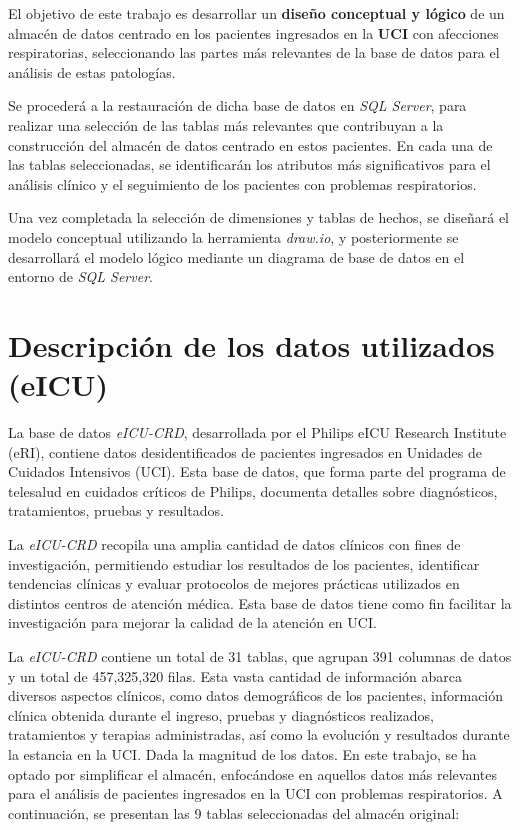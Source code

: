 \documentclass[12pt, a4paper, twoside]{article}
\begin{document}
	El objetivo de este trabajo es desarrollar un \textbf{diseño conceptual y lógico} de un almacén de datos centrado en los pacientes ingresados en la \textbf{UCI} con afecciones respiratorias, seleccionando las partes más relevantes de la base de datos para el análisis de estas patologías.
	
	Se procederá a la restauración de dicha base de datos en \textit{SQL Server}, para realizar una selección de las tablas más relevantes que contribuyan a la construcción del almacén de datos centrado en estos pacientes. En cada una de las tablas seleccionadas, se identificarán los atributos más significativos para el análisis clínico y el seguimiento de los pacientes con problemas respiratorios. 
	
	Una vez completada la selección de dimensiones y tablas de hechos, se diseñará el modelo conceptual utilizando la herramienta \textit{draw.io}, y posteriormente se desarrollará el modelo lógico mediante un diagrama de base de datos en el entorno de \textit{SQL Server}. 
	
	\section{Descripción de los datos utilizados (eICU)}
	
	 La base de datos \textit{eICU-CRD}, desarrollada por el Philips eICU Research Institute (eRI), contiene datos desidentificados de pacientes ingresados en Unidades de Cuidados Intensivos (UCI). Esta base de datos, que forma parte del programa de telesalud en cuidados críticos de Philips, documenta detalles sobre diagnósticos, tratamientos, pruebas y resultados.
	
	La \textit{eICU-CRD} recopila una amplia cantidad de datos clínicos con fines de investigación, permitiendo estudiar los resultados de los pacientes, identificar tendencias clínicas y evaluar protocolos de mejores prácticas utilizados en distintos centros de atención médica. Esta base de datos tiene como fin facilitar la investigación para mejorar la calidad de la atención en UCI.
	
	La \textit{eICU-CRD} contiene un total de 31 tablas, que agrupan 391 columnas de datos y un total de 457,325,320 filas. Esta vasta cantidad de información abarca diversos aspectos clínicos, como datos demográficos de los pacientes, información clínica obtenida durante el ingreso, pruebas y diagnósticos realizados, tratamientos y terapias administradas, así como la evolución y resultados durante la estancia en la UCI. Dada la magnitud de los datos. En este trabajo, se ha optado por simplificar el almacén, enfocándose en aquellos datos más relevantes para el análisis de pacientes ingresados en la UCI con problemas respiratorios. A continuación, se presentan las 9 tablas seleccionadas del almacén original:
	
\end{document}

